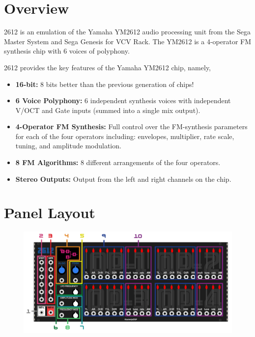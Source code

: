 \documentclass[12pt,a4paper]{article}
\begin{document}


\section{Overview}

2612 is an emulation of the Yamaha YM2612 audio processing unit from the Sega Master System and Sega Genesis for VCV Rack. The YM2612 is a 4-operator FM synthesis chip with 6 voices of polyphony.

2612 provides the key features of the Yamaha YM2612 chip, namely,
\begin{itemize}
  \item \textbf{16-bit:} 8 bits better than the previous generation of chips!
  \item \textbf{6 Voice Polyphony:} 6 independent synthesis voices with independent V/OCT and Gate inputs (summed into a single mix output).
  \item \textbf{4-Operator FM Synthesis:} Full control over the FM-synthesis parameters for each of the four operators including: envelopes, multiplier, rate scale, tuning, and amplitude modulation.
  \item \textbf{8 FM Algorithms:} 8 different arrangements of the four operators.
  \item \textbf{Stereo Outputs:} Output from the left and right channels on the chip.
\end{itemize}


\clearpage
\section{Panel Layout}

\begin{figure}[!htp]
\centering
\includegraphics[width=\maxwidth{\textwidth}]{2612-Manual}
\end{figure}
\end{document}
